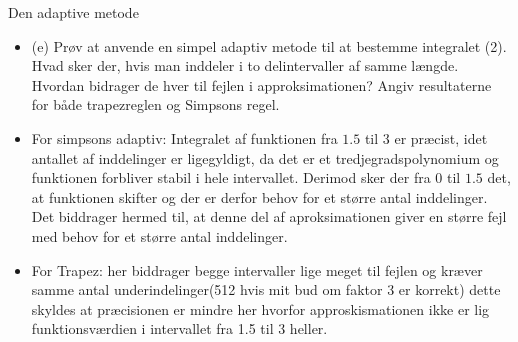 \begin{frame}{Den adaptive metode}
    \begin{itemize}
        \item (e) Prøv at anvende en simpel adaptiv metode til at bestemme integralet (2). 
        Hvad sker der, hvis man inddeler i to delintervaller af samme længde. 
        Hvordan bidrager de hver til fejlen i approksimationen? 
        Angiv resultaterne for både trapezreglen og Simpsons regel.
        \item For simpsons adaptiv: Integralet af funktionen fra $1.5$ til $3$ er præcist, idet antallet af inddelinger er ligegyldigt, da det er et tredjegradspolynomium og funktionen forbliver stabil i hele intervallet. 
        Derimod sker der fra $0$ til $1.5$ det, at funktionen skifter og der er derfor behov for et større antal inddelinger. 
        Det biddrager hermed til, at denne del af aproksimationen giver en større fejl med behov for et større antal inddelinger.
        \item For Trapez: her biddrager begge intervaller lige meget til fejlen og kræver samme antal underindelinger(512 hvis mit bud om faktor 3 er korrekt) dette skyldes at præcisionen er mindre her hvorfor approskismationen ikke er lig funktionsværdien i intervallet fra 1.5 til 3 heller.
    \end{itemize}
\end{frame}